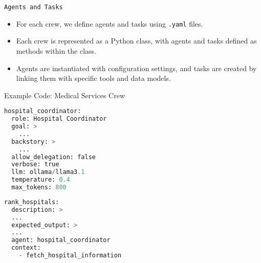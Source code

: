\begin{frame}[fragile]{\texttt{Agents and Tasks}}
    \begin{itemize}
        \item For each crew, we define agents and tasks using \texttt{.yaml} files.
        \item Each crew is represented as a Python class, with agents and tasks defined as methods within the class.
        \item Agents are instantiated with configuration settings, and tasks are created by linking them with specific tools and data models.
    \end{itemize}
    \begin{block}{Example Code: Medical Services Crew}
        \begin{minipage}[t]{0.48\textwidth} %
            \centering
            \begin{lstlisting}[language=Python, breaklines=true]
hospital_coordinator:
  role: Hospital Coordinator
  goal: >
    ...
  backstory: >
    ...
  allow_delegation: false
  verbose: true
  llm: ollama/llama3.1
  temperature: 0.4
  max_tokens: 800

            \end{lstlisting}
        \end{minipage}
        \hfill %
        \begin{minipage}[t]{0.48\textwidth} %
            \centering
            \begin{lstlisting}[language=Python, breaklines=true]
rank_hospitals:
  description: >
  ...
  expected_output: >
  ...
  agent: hospital_coordinator
  context:
    - fetch_hospital_information
            \end{lstlisting}
        \end{minipage}
    \end{block}
\end{frame}
